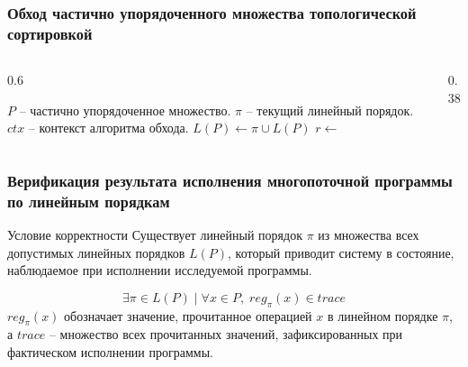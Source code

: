 \begin{frame}
  \frametitle{Обход частично упорядоченного множества топологической
  сортировкой}

  \begin{columns}[T, onlytextwidth]
    \begin{column}{0.6\textwidth}
      \label{alg:topo}
      \begin{algorithmic}[1]
        \Require $P$ -- частично упорядоченное множество.
        \Require $\pi$ -- текущий линейный порядок.
        \Require $ctx$ -- контекст алгоритма обхода.
        \State $L(P) \gets \pi \cup L(P)$
        \EndIf
        \ForAll{\textcolor{accentBlue}{$x \in \min(P)$}}
        \State $r \gets$ 
        \State {}
        \State \Return
        \EndIf
        \EndFor
        \EndFunction
      \end{algorithmic}
    \end{column}

    \begin{column}{0.38\textwidth}
      \centering
      \scalebox{0.45}{}
      \label{fig:topo-trav}
    \end{column}
  \end{columns}
\end{frame}

\begin{frame}
  \frametitle{Верификация результата исполнения многопоточной
  программы по линейным порядкам}

  \begin{block}{Условие корректности}
    Существует линейный порядок $\pi$ из множества всех
    допустимых линейных порядков $L(P)$, который приводит систему в
    состояние, наблюдаемое при исполнении исследуемой программы.

  \end{block}

  \begin{equation}
    \label{eq:verif-base}
    \exists \pi \in L(P) \mid \forall x \in P,\; reg_{\pi}(x) \in trace
    \nonumber
  \end{equation}
  $reg_{\pi}(x)$ обозначает значение, прочитанное операцией $x$ в
  линейном порядке $\pi$, а $trace$ -- множество всех прочитанных
  значений, зафиксированных при фактическом исполнении программы.


\end{frame}

